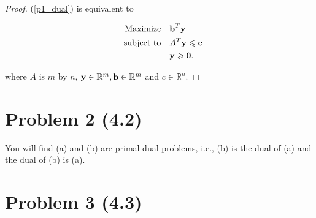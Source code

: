 \documentclass[12pt]{article}
\begin{document}
\begin{proof}
(\ref{p1_dual}) is equivalent to

$$
\begin{aligned}
 \quad \text{Maximize} \quad & \textbf b^T\textbf y\\
\text{subject\  to} \quad & 
A^T \textbf y \leqslant \textbf{c} \\
& \textbf y \geqslant \textbf 0.
\end{aligned}
$$

where $A$ is $m$ by $n$, $\textbf y \in\mathbb R^m, \textbf b\in \mathbb R^m$ and $c\in\mathbb R^n$. 

\end{proof}





\section*{Problem 2 (4.2)}

You will find (a) and (b) are primal-dual problems, i.e., (b) is the dual of (a) and the dual of (b) is (a).

\section*{Problem 3 (4.3)}
\end{document}
